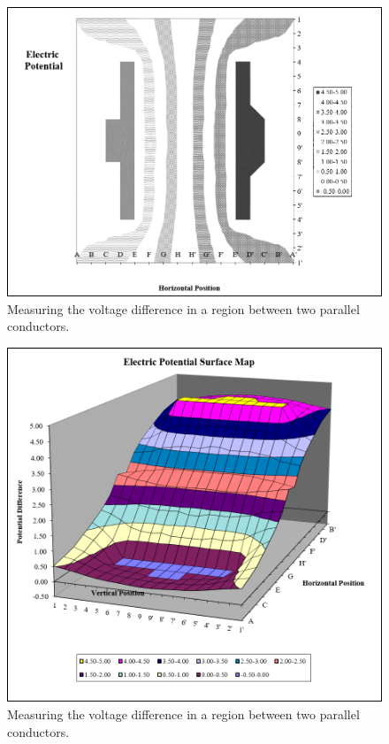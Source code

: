 \documentclass[letterpaper]{article}
\begin{document}
\begin{figure}[H]
  \centering
  \includegraphics[width=\textwidth]{chart2.png}
  \caption{Measuring the voltage difference in a region between two parallel conductors.}
\end{figure}

\begin{figure}[H]
  \centering
  \includegraphics[width=\textwidth]{chart3.png}
  \caption{Measuring the voltage difference in a region between two parallel conductors.}
\end{figure}
\end{document}
